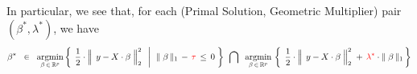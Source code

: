 In particular, we see that,
for each (Primal Solution, Geometric Multiplier) pair \,$(\beta^{*},\lambda^{*})$,
we have
\begin{equation*}
\beta^{*}
\;\; \in \;\;
	\underset{\beta\,\in\,\Re^{p}}{\argmin}
	\left\{\;
		\left.
		\dfrac{1}{2}
		\cdot
		\left\Vert\;\, y \overset{{\color{white}.}}{-} X\cdot\beta \;\right\Vert_{2}^{2}
		\;\;\,\right\vert\;\,
		\Vert\;\beta\,\Vert_{1} \, - \, {\color{red}\tau} \, \leq \, 0
		\;\right\}
	\;\,\bigcap\;\;
	\underset{\beta\,\in\,\Re^{p}}{\argmin}\,
	\left\{\;\,
		\dfrac{1}{2}
		\cdot
		\left\Vert\;\, y \overset{{\color{white}.}}{-} X\cdot\beta \;\right\Vert_{2}^{2}
		\; + \,
		{\color{red}\lambda^{*}} \cdot \Vert\;\beta\,\Vert_{1} 
		\,\right\}
\end{equation*}


\renewcommand{\theenumi}{\roman{enumi}}
\renewcommand{\labelenumi}{\textnormal{(\theenumi)}$\;\;$}

